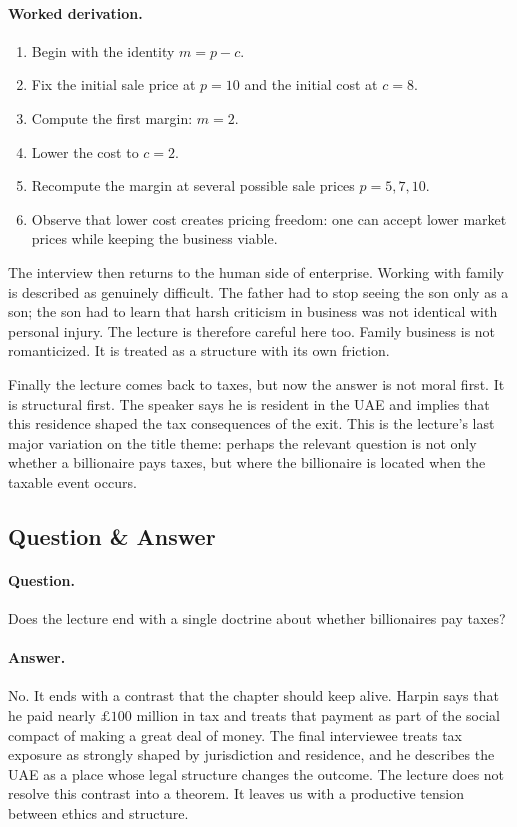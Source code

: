 \paragraph{Worked derivation.}
\begin{enumerate}
\item Begin with the identity \(m=p-c\).
\item Fix the initial sale price at \(p=10\) and the initial cost at \(c=8\).
\item Compute the first margin: \(m=2\).
\item Lower the cost to \(c=2\).
\item Recompute the margin at several possible sale prices \(p=5,7,10\).
\item Observe that lower cost creates pricing freedom: one can accept lower market prices while keeping the business viable.
\end{enumerate}

The interview then returns to the human side of enterprise. Working with family is described as genuinely difficult. The father had to stop seeing the son only as a son; the son had to learn that harsh criticism in business was not identical with personal injury. The lecture is therefore careful here too. Family business is not romanticized. It is treated as a structure with its own friction.

Finally the lecture comes back to taxes, but now the answer is not moral first. It is structural first. The speaker says he is resident in the UAE and implies that this residence shaped the tax consequences of the exit. This is the lecture's last major variation on the title theme: perhaps the relevant question is not only whether a billionaire pays taxes, but where the billionaire is located when the taxable event occurs.

\subsection{Question \& Answer}

\paragraph{Question.} Does the lecture end with a single doctrine about whether billionaires pay taxes?

\paragraph{Answer.} No. It ends with a contrast that the chapter should keep alive. Harpin says that he paid nearly \(\pounds 100\) million in tax and treats that payment as part of the social compact of making a great deal of money. The final interviewee treats tax exposure as strongly shaped by jurisdiction and residence, and he describes the UAE as a place whose legal structure changes the outcome. The lecture does not resolve this contrast into a theorem. It leaves us with a productive tension between ethics and structure.

